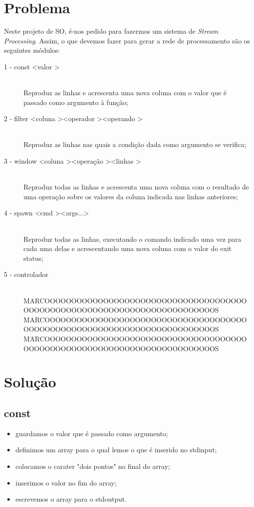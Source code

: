 \documentclass[a4paper]{article}
\begin{document}
\section{Problema}
\label{sec:problema}
Neste projeto de SO, é-nos pedido para fazermos um sistema de \textit{Stream Processing}. Assim, o que devemos fazer para gerar a rede de processamento são os seguintes módulos:
\begin{description}
\item[1 - const \textless valor \textgreater]\hfill \\
Reproduz as linhas e acrescenta uma nova coluna com o valor que é passado como argumento à função;
\item[2 - filter \textless coluna \textgreater \textless operador \textgreater \textless operando \textgreater]\hfill \\
Reproduz as linhas nas quais a condição dada como argumento se verifica;
\item[3 - window \textless coluna \textgreater \textless operação \textgreater \textless linhas \textgreater]\hfill \\
Reproduz todas as linhas e acrescenta uma nova coluna com o resultado de uma operação sobre os valores da coluna indicada nas linhas anteriores;
\item[4 - spawn \textless cmd \textgreater \textless args...\textgreater]\hfill \\
Reproduz todas as linhas, executando o comando indicado uma vez para cada uma delas e acrescentando uma nova coluna com o valor do exit status;
\item[5 - controlador]\hfill \\
MARCOOOOOOOOOOOOOOOOOOOOOOOOOOOOOOOOOOOOOOOOOOOOOOOOOOOOOOOOOOOOOOOOOOOOOOOOOOS
MARCOOOOOOOOOOOOOOOOOOOOOOOOOOOOOOOOOOOOOOOOOOOOOOOOOOOOOOOOOOOOOOOOOOOOOOOOOOS
MARCOOOOOOOOOOOOOOOOOOOOOOOOOOOOOOOOOOOOOOOOOOOOOOOOOOOOOOOOOOOOOOOOOOOOOOOOOOS
\end{description}

\section{Solução}
\label{sec:solucao}

\subsection{const}

\begin{itemize}
\item guardamos o valor que é passado como argumento;
\item definimos um array para o qual lemos o que é inserido no stdinput;
\item colocamos o carater "dois pontos" no final do array;
\item inserimos o valor no fim do array;
\item escrevemos o array para o stdoutput.
\end{itemize}
\end{document}
